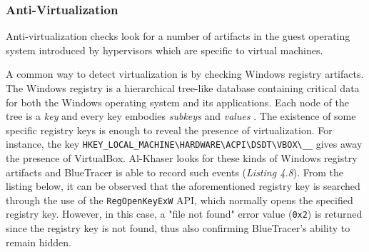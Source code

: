 \subsubsection*{Anti-Virtualization}
Anti-virtualization checks look for a number of artifacts in the guest operating system introduced by hypervisors which are specific to virtual machines.

A common way to detect virtualization is by checking Windows registry artifacts. The Windows registry is a hierarchical tree-like database containing critical data for both the Windows operating system and its applications. Each node of the tree is a \textit{key} and every key embodies \textit{subkeys} and \textit{values} \cite{Regs}. The existence of some specific registry keys is enough to reveal the presence of virtualization. For instance, the key \texttt{HKEY\_LOCAL\_MACHINE\textbackslash}\texttt{{HARDWARE}\textbackslash{ACPI}\textbackslash{DSDT}}\texttt{\textbackslash{VBOX}\textbackslash\_\_}
gives away the presence of VirtualBox. Al-Khaser looks for these kinds of Windows registry artifacts and BlueTracer is able to record such events (\textit{Listing 4.8}). From the listing below, it can be observed that the aforementioned registry key is searched through the use of the \texttt{RegOpenKeyExW} API, which normally opens the specified registry key. However, in this case, a "file not found" error value (\texttt{0x2}) is returned since the registry key is not found, thus also confirming BlueTracer's ability to remain hidden.

